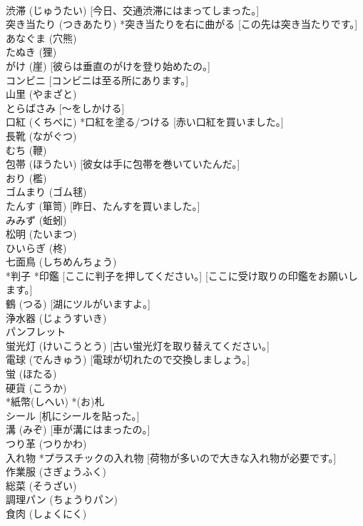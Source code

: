 \documentclass[8pt]{extreport}
\begin{document}
\begin{CJK}{UTF8}{min}
\\	渋滞 (じゅうたい) [今日、交通渋滞にはまってしまった。]
\\	突き当たり (つきあたり) *突き当たりを右に曲がる [この先は突き当たりです。]
\\	あなぐま (穴熊)
\\	たぬき (狸)
\\	がけ (崖) [彼らは垂直のがけを登り始めたの。]
\\	コンビニ [コンビニは至る所にあります。]
\\	山里 (やまざと)
\\	とらばさみ [～をしかける]
\\	口紅 (くちべに) *口紅を塗る/つける [赤い口紅を買いました。]
\\	長靴 (ながぐつ)
\\	むち (鞭)
\\	包帯 (ほうたい) [彼女は手に包帯を巻いていたんだ。]
\\	おり (檻)
\\	ゴムまり (ゴム毬)
\\	たんす (箪笥) [昨日、たんすを買いました。]
\\	みみず (蚯蚓)
\\	松明 (たいまつ)
\\	ひいらぎ (柊)
\\	七面鳥 (しちめんちょう)
\\	*判子 *印鑑 [ここに判子を押してください。] [ここに受け取りの印鑑をお願いします。]
\\	鶴 (つる) [湖にツルがいますよ。]
\\	浄水器 (じょうすいき)
\\	パンフレット
\\	蛍光灯 (けいこうとう) [古い蛍光灯を取り替えてください。]
\\	電球 (でんきゅう) [電球が切れたので交換しましょう。]
\\	蛍 (ほたる)
\\	硬貨 (こうか)
\\	*紙幣(しへい) *(お)札
\\	シール [机にシールを貼った。]
\\	溝 (みぞ) [車が溝にはまったの。]
\\	つり革 (つりかわ)
\\	入れ物 *プラスチックの入れ物 [荷物が多いので大きな入れ物が必要です。]
\\	作業服 (さぎょうふく)
\\	総菜 (そうざい)
\\	調理パン (ちょうりパン)
\\	食肉 (しょくにく)

\end{CJK}
\end{document}
